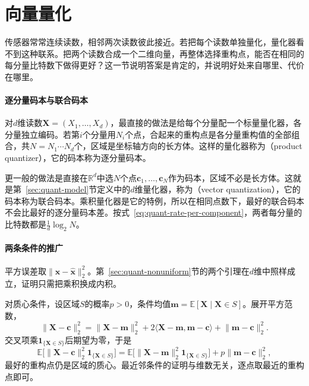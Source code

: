 \section{向量量化}
\label{sec:quant-vector}

传感器常常连续读数，相邻两次读数彼此接近。若把每个读数单独量化，量化器看不到这种联系。把两个读数合成一个二维向量，再整体选择重构点，能否在相同的每分量比特数下做得更好？这一节说明答案是肯定的，并说明好处来自哪里、代价在哪里。

\paragraph{逐分量码本与联合码本}
对$d$维读数$\bm{X}=(X_1,\dots,X_d)$，最直接的做法是给每个分量配一个标量量化器，各分量独立编码。若第$i$个分量用$N_i$个点，合起来的重构点是各分量重构值的全部组合，共$N=N_1\cdots N_d$个，区域是坐标轴方向的长方体。这样的量化器称为（product quantizer），它的码本称为逐分量码本。

更一般的做法是直接在$\mathbb{R}^{d}$中选$N$个点$\bm{c}_1,\dots,\bm{c}_N$作为码本，区域不必是长方体。这就是第~\ref{sec:quant-model}节定义中的$d$维量化器，称为（vector quantization），它的码本称为联合码本。乘积量化器是它的特例，所以在相同点数下，最好的联合码本不会比最好的逐分量码本差。按式~\eqref{eq:quant-rate-per-component}，两者每分量的比特数都是$\frac1d\log_2N$。

\paragraph{两条条件的推广}
平方误差取$\lVert\bm{x}-\hat{\bm{x}}\rVert_2^{2}$。第~\ref{sec:quant-nonuniform}节的两个引理在$d$维中照样成立，证明只需把乘积换成内积。

对质心条件，设区域$S$的概率$p>0$，条件均值$\bm{m}=\mathbb{E}[\bm{X}\mid\bm{X}\in S]$。展开平方范数，
\[
 \lVert\bm{X}-\bm{c}\rVert_2^{2}=\lVert\bm{X}-\bm{m}\rVert_2^{2}+2\langle\bm{X}-\bm{m},\bm{m}-\bm{c}\rangle+\lVert\bm{m}-\bm{c}\rVert_2^{2} .
\]
交叉项乘$\mathbf{1}_{\{\bm{X}\in S\}}$后期望为零，于是
\begin{equation}
 \mathbb{E}\bigl[\lVert\bm{X}-\bm{c}\rVert_2^{2}\mathbf{1}_{\{\bm{X}\in S\}}\bigr]=\mathbb{E}\bigl[\lVert\bm{X}-\bm{m}\rVert_2^{2}\mathbf{1}_{\{\bm{X}\in S\}}\bigr]+p\lVert\bm{m}-\bm{c}\rVert_2^{2} ,
 \label{eq:quant-vector-parallel-axis}
\end{equation}
最好的重构点仍是区域的质心。最近邻条件的证明与维数无关，逐点取最近的重构点即可。

